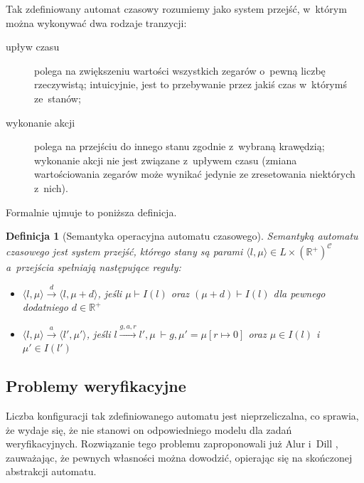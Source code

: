 \documentclass{pracamgr}
\newcommand{\pair}[2]{\langle #1, #2 \rangle}
\theoremstyle{plain}
\newtheorem{definition}{Definicja}
\begin{document}
Tak zdefiniowany automat czasowy rozumiemy jako
system przejść, w~którym można wykonywać dwa rodzaje tranzycji:
\begin{description}
  \item[upływ czasu] polega na zwiększeniu wartości wszystkich zegarów
  o~pewną liczbę rzeczywistą; intuicyjnie, jest to przebywanie przez
  jakiś czas w~którymś ze~stanów;
  \item[wykonanie akcji] polega na przejściu do innego stanu
  zgodnie z~wybraną krawędzią; wykonanie akcji nie jest związane
  z~upływem czasu (zmiana wartościowania zegarów może wynikać jedynie
  ze zresetowania niektórych z~nich).
\end{description}
Formalnie ujmuje to poniższa definicja.
\begin{definition}[Semantyka operacyjna automatu czasowego] Semantyką
  automatu czasowego jest system przejść, którego stany są parami
  $\pair{l}{\mu} \in L \times (\mathbb{R}^+)^{\mathcal{C}}$ a~przejścia
  spełniają następujące reguły:
  \begin{itemize}
    \item $\pair{l}{\mu} \stackrel{d}{\longrightarrow} \pair{l}{\mu+d}$,
    jeśli $\mu \vdash I(l)$ oraz $(\mu+d) \vdash I(l)$ dla pewnego
    dodatniego $d \in \mathbb{R}^{+}$
    \item $\pair{l}{\mu} \stackrel{a}{\longrightarrow} \pair{l'}{\mu'}$,
    jeśli $l \stackrel{g, a, r}{\longrightarrow} l', \mu~\vdash g, \mu' =
    \mu[r \mapsto 0]$ oraz $\mu \in I(l)$ i $\mu' \in I(l')$
  \end{itemize}
\end{definition}

\subsection{Problemy weryfikacyjne}
\label{ss:ta:theory:verification}
Liczba konfiguracji tak zdefiniowanego automatu jest nieprzeliczalna, co
sprawia, że wydaje się, że nie stanowi on odpowiedniego modelu dla zadań
weryfikacyjnych. Rozwiązanie tego problemu zaproponowali już Alur
i~Dill \cite{alur-dill}, zauważając, że pewnych własności można dowodzić,
opierając się na skończonej abstrakcji automatu.
\end{document}

